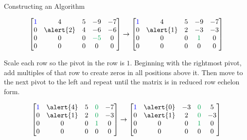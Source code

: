 \documentclass[xcolor=dvipsnames,aspectratio=169,t]{beamer}
\begin{document}
\begin{frame}{Constructing an Algorithm}

 \[ \begin{bmatrix}   \colorb{1} & 4 & 5 & -9 & -7\\
  0 & \alert{2} & 4 & -6 & -6 \\
  0 & 0 & 0 & \colorg{-5} & 0 \\
  0 & 0 & 0 & 0 & 0 \end{bmatrix}
 \rightarrow
  \begin{bmatrix}   \colorb{1} & 4 & 5 & -9 & -7\\
  0 & \alert{1} & 2 & -3 & -3 \\
  0 & 0 & 0 & \colorg{1} & 0 \\
  0 & 0 & 0 & 0 & 0 \end{bmatrix}
 \]

\bb
\setcounter{enumi}{4}
\ii Scale each row so the pivot in the row is $1$.
\ii Beginning with the rightmost pivot, add multiples of that row to create zeros in all positions above it. Then move to the next pivot to the left and repeat until the matrix is in reduced row echelon form.

 \[ \begin{bmatrix}   
  \colorb{1} & \alert{4} & 5 & \colorg{0} & -7\\
  0 & \alert{1} & 2 & \colorg{0} & -3 \\
  0 & 0 & 0 & \colorg{1} & 0 \\
  0 & 0 & 0 & 0 & 0 \end{bmatrix}
 \rightarrow
 \begin{bmatrix}   
  \colorb{1} & \alert{0} & -3 & \colorg{0} & 5\\
  0 & \alert{1} & 2 & \colorg{0} & -3 \\
  0 & 0 & 0 & \colorg{1} & 0 \\
  0 & 0 & 0 & 0 & 0 \end{bmatrix}
  \]
 \ee

\end{frame}
\end{document}
